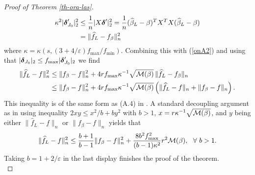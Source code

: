\documentclass[dvips,aos]{imsart}
\numberwithin{equation}{section}
\theoremstyle{plain}
\def\sf{}
\def\wideth{\widehat}
\def\scm{{\cal M}}
\def\wh{\widehat}
\def\eps{\varepsilon}
\newcommand{\bD}{\mbox{\boldmath$\delta$}}
\begin{document}
\begin{proof}[Proof of Theorem \ref{th-ora-las}]
\begin{equation*}
\begin{split}
\kappa^2 |\bD_{J_0}'|_2^2 &\le
 \frac{1}{n}|X\bD'|_2^2 =
 \frac{1}{n}(\wh\beta_L-\beta)^T X^TX (\wh\beta_L-\beta)
 \\
 &= \| \wideth f_L -{\sf
 f}_{\beta}\|_n^2
 \end{split}
\end{equation*}
where $\kappa=\kappa(s,(3+4/\eps)f_{\max}/f_{\min})$. Combining this
with (\ref{onA2}) and using that $|\bD_{J_0}|_2 \le
f_{\max}|\bD_{J_0}'|_2$ we find
\begin{equation*}\label{onA7}
\begin{split}
\| \wideth f_L - f\|_n^2
 &\le \|
{\sf f}_{\beta} - f\|_n^2 +
4rf_{\max}\kappa^{-1}\sqrt{\scm(\beta)}\,\| \wideth f_L -{\sf
f}_{\beta}\|_n
\\
&\le \| {\sf f}_{\beta} - f\|_n^2 +
4rf_{\max}\kappa^{-1}\sqrt{\scm(\beta)}\left(\| \wideth f_L -f\|_n +
\|{\sf f}_{\beta}-f\|_n\right).
\end{split}
\end{equation*}
This inequality is of the same form as (A.4) in \cite{btw07}. A
standard decoupling argument as in \cite{btw07} using inequality
$2xy\le x^2/b + by^2$ with $b>1$, $x=r\kappa^{-1}\sqrt{\scm(\beta)}$,
and $y$ being either $\| \wideth f_L -f\|_n$ or $\|{\sf
f}_{\beta}-f\|_n$ yields that
\begin{eqnarray*}\label{5}
\| \wideth{f}_L -f\|_n ^2 \le  \frac{b+1}{b-1} \| {\sf f}_{\beta}
- f\|_n^2 + \frac{8b^2f_{\max}^2}{(b-1)\kappa^2} r^2 \scm(\beta), \ \
\forall \ b>1.
\end{eqnarray*}
Taking $b=1+2/\eps$ in the last display finishes
the proof of the theorem.\\
\end{proof}






\end{document}
